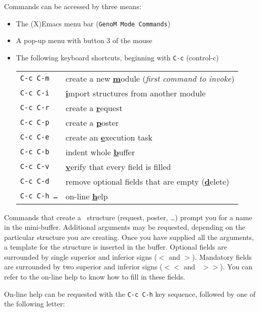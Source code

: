 Commands can be accessed by three means:
\begin{itemize}
\item The (X)Emacs menu bar ({\tt GenoM Mode Commands})
\item A pop-up menu with button 3 of the mouse
\item The following keyboard shortcuts, beginning with {\tt C-c} (control-c)

{\small
\begin{tabular}{|l|p{10cm}|}
\hline
\tt C-c C-m & create a new \underline{\bf m}odule  ({\em first command to invoke})\\
\tt C-c C-i & \underline{\bf i}mport structures from another module\\
\tt C-c C-r & create a \underline{\bf r}equest \\
\tt C-c C-p & create a \underline{\bf p}oster \\
\tt C-c C-e & create an \underline{\bf e}xecution task\\
\hline
\tt C-c C-b & indent whole \underline{\bf b}uffer \\
\tt C-c C-v & \underline{\bf v}erify that every field is filled \\
\tt C-c C-d & remove optional fields that are empty (\underline{\bf d}elete) \\
\hline
\tt C-c C-h \ldots & on-line \underline{\bf h}elp\\
\hline
\end{tabular}}
\end{itemize}

Commands that create a \GenoM\ structure (request, poster, \ldots) prompt
you  for  a   name in  the   mini-buffer.  Additional   arguments may  be
requested, depending on the particular structure you  are creating.  Once
you  have  supplied all the  arguments,  a template  for the structure is
inserted  in the buffer.   Optional   fields  are surrounded  by   single
superior and inferior signs ({\tt  $<$} and {\tt $>$}). Mandatory  fields
are surrounded by two  superior and inferior signs  ({\tt $<<$}  and {\tt
$>>$}). You  can refer to the  on-line help to know  how to fill in these
fields.

On-line help can be requested with the {\tt C-c C-h} key sequence,
followed by one of the following letter:

